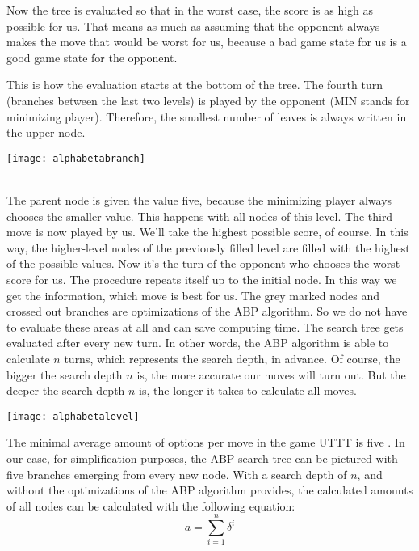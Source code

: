 Now the tree is evaluated so that in the worst case, the score is as high as possible for us.
That means as much as assuming that the opponent always makes the move that would be worst for us, because a bad game state for us is a good game state for the opponent. 

This is how the evaluation starts at the bottom of the tree. The fourth turn (branches between the last two levels) is played by the opponent (MIN stands for minimizing player). Therefore, the smallest number of leaves is always written in the upper node.\\
\begin{fixedpic}
	\centering
	\texttt{[image: alphabetabranch]}
\end{fixedpic}\\
The parent node is given the value five, because the minimizing player always chooses the smaller value. This happens with all nodes of this level. The third move is now played by us. We'll take the highest possible score, of course. In this way, the higher-level nodes of the previously filled level are filled with the highest of the possible values. Now it's the turn of the opponent who chooses the worst score for us. The procedure repeats itself up to the initial node. In this way we get the information, which move is best for us. The grey marked nodes and crossed out branches are optimizations of the \ac{ABP} algorithm. So we do not have to evaluate these areas at all and can save computing time.
The search tree gets evaluated after every new turn. In other words, the \ac{ABP} algorithm is able to calculate $n$ turns, which represents the search depth, in advance. Of course, the bigger the search depth $n$ is, the more accurate our moves will turn out. But the deeper the search depth $n$ is, the longer it takes to calculate all moves.

\begin{fixedpic}
	\centering
	\texttt{[image: alphabetalevel]}
\end{fixedpic}

The minimal average amount of options per move in the game \ac{UTTT} is five \cite[p.~1-2]{web:amar2013}.
In our case, for simplification purposes, the \ac{ABP} search tree can be pictured with five branches emerging from every new node. With a search depth of $n$, and without the optimizations of the \ac{ABP} algorithm provides, the calculated amounts  of all nodes  can be calculated with the following  equation:  $$a = \sum_{i=1}^{n} 	\delta^{i}$$

